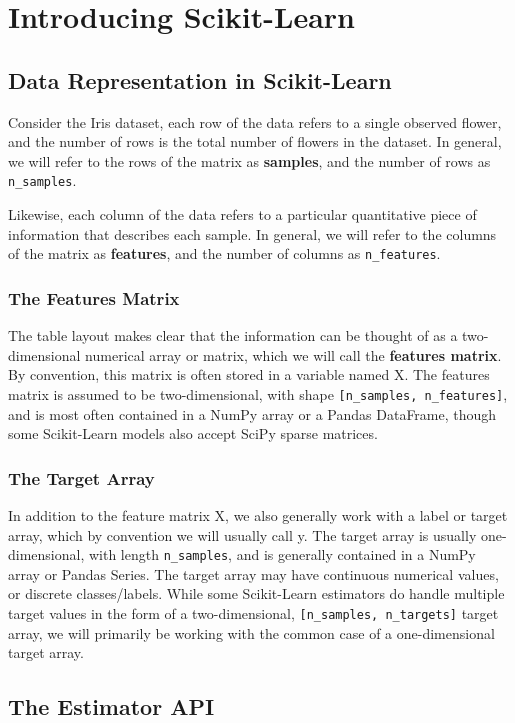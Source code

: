\chapter{Introducing Scikit-Learn\label{Ch38}}
\section{Data Representation in Scikit-Learn}
Consider the Iris dataset, each row of the data refers to a single observed flower, and the number of rows
is the total number of flowers in the dataset. In general, we will refer to the rows of
the matrix as \textbf{samples}, and the number of rows as \verb|n_samples|.

Likewise, each column of the data refers to a particular quantitative piece of information that describes each sample. In general, we will refer to the columns of the matrix
as \textbf{features}, and the number of columns as \verb|n_features|.

\subsection*{The Features Matrix}
The table layout makes clear that the information can be thought of as a two-
dimensional numerical array or matrix, which we will call the \textbf{features matrix}. By convention, this matrix is often stored in a variable named X. The features matrix is
assumed to be two-dimensional, with shape \verb|[n_samples, n_features]|, and is most
often contained in a NumPy array or a Pandas DataFrame, though some Scikit-Learn
models also accept SciPy sparse matrices.

\subsection*{The Target Array}
In addition to the feature matrix X, we also generally work with a label or target array,
which by convention we will usually call y. The target array is usually one-
dimensional, with length \verb|n_samples|, and is generally contained in a NumPy array or
Pandas Series. The target array may have continuous numerical values, or discrete
classes/labels. While some Scikit-Learn estimators do handle multiple target values in
the form of a two-dimensional, \verb|[n_samples, n_targets]| target array, we will primarily be working with the common case of a one-dimensional target array.

\section{The Estimator API}
